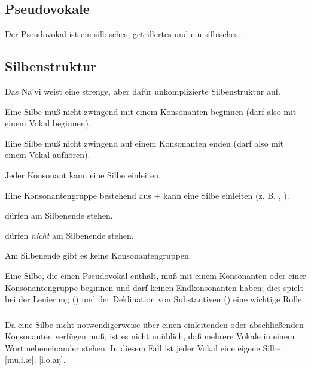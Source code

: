 \subsection{Pseudovokale}
Der Pseudovokal  ist ein silbisches,
getrillertes {\gplus [r̩ː]} und  ein silbisches {\gplus [l̩ː]}.

\subsection{Silbenstruktur}
Das Na’vi weist eine strenge, aber daf\"ur unkomplizierte Silbenstruktur auf.

\begin{itemize*}
  \item Eine Silbe mu\ss{} nicht zwingend mit einem Konsonanten beginnen
    (darf also mit einem Vokal beginnen).
  \item Eine Silbe mu\ss{} nicht zwingend auf einem Konsonanten enden
    (darf also mit einem Vokal aufh\"oren).
  \item Jeder Konsonant kann eine Silbe einleiten.
  \item Eine Konsonantengruppe bestehend aus  $+$  kann eine Silbe einleiten (z. B.
    , ).
  \item {} d\"urfen am Silbenende stehen.
  \item {} d\"urfen \textit{nicht} am Silbenende stehen.
  \item Am Silbenende gibt es keine Konsonantengruppen.
  \item \label{l-and-s:pseudo-no-null} Eine Silbe, die einen Pseudovokal
    enth\"alt, mu\ss{} mit einem Konsonanten oder einer Konsonantengruppe
    beginnen und darf keinen Endkonsonanten haben; dies spielt bei der
    Lenierung () und der Deklination
    von Substantiven () eine wichtige Rolle.
\end{itemize*}

\subsubsection{} Da eine Silbe nicht notwendigerweise über einen einleitenden oder
abschlie\ss{}enden Konsonanten verf\"ugen mu\ss{}, ist es nicht un\"ublich, da\ss{}
mehrere Vokale in einem Wort nebeneinander stehen. In diesem Fall ist jeder Vokal
eine eigene Silbe.  [mu.i.æ],  [i.o.aŋ].

